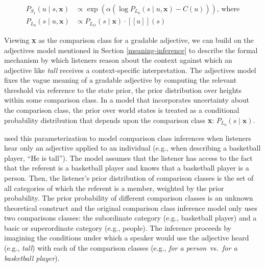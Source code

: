 \documentclass{sp}
\newcommand{\gcs}[1]{\textcolor{blue}{[gcs: #1]}}
\newcommand{\sem}[1]{\ensuremath{[\![#1]\!]}}
\begin{document}
\begin{align} \label{S1-context}
P_{S_1}(u\mid s, \textbf{x}) & \propto \exp (\alpha (\log P_{L_0}(s \mid u, \textbf{x}) - C(u)))\text{, where} \\
  P_{L_0}(s \mid u, \textbf{x}) & \propto P_{L_O}(s \mid \textbf{x})  \cdot \sem{u}(s) \nonumber
\end{align}

Viewing \textbf{x} as the comparison class for a gradable adjective, we can build on the \citeauthor{lassitergoodman2013} adjectives model mentioned in Section \ref{meaning-inference} to describe the formal mechanism by which listeners reason about the context against which an adjective like \emph{tall} receives a context-specific interpretation. The adjectives model fixes the vague meaning of a gradable adjective by computing the relevant threshold via reference to the state prior, the prior distribution over heights within some comparison class. In a model that incorporates uncertainty about the comparison class, the prior over world states is treated as a conditional probability distribution that depends upon the comparison class \textbf{x}: $P_{L_0}(s\mid \textbf{x})$.


\cite{tessler2017comparisonclass} used this parameterization to model comparison class inferences when listeners hear only an adjective applied to an individual (e.g., when describing a basketball player, ``He is tall'').
The model assumes that the listener has access to the fact that the referent is a basketball player and knows that a basketball player is a person. Then, the listener's prior distribution of comparison classes is the set of all categories of which the referent is a member, weighted by the prior probability. The prior probability of different comparison classes is an unknown theoretical construct and the original comparison class inference model only uses two comparisons classes: the subordinate category (e.g., basketball player) and a basic or superordinate category (e.g., people). The inference proceeds by imagining the conditions under which a speaker would use the adjective heard (e.g., \emph{tall}) with each of the comparison classes (e.g., \emph{for a person}~vs.~\emph{for a basketball player}).


\end{document}
